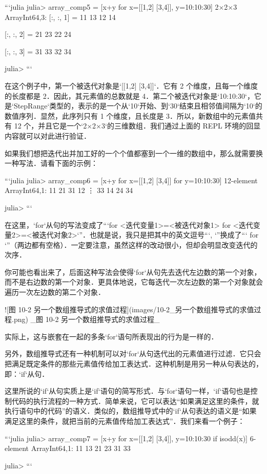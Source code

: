 ```julia
julia> array_comp5 = [x+y for x=[[1,2] [3,4]], y=10:10:30]
2×2×3 Array{Int64,3}:
[:, :, 1] =
 11  13
 12  14

[:, :, 2] =
 21  23
 22  24

[:, :, 3] =
 31  33
 32  34

julia> 
```

在这个例子中，第一个被迭代对象是`[[1,2] [3,4]]`．它有 2 个维度，且每一个维度的长度都是 2．因此，其元素值的总数就是 4．第二个被迭代对象是`10:10:30`，它是`StepRange`类型的，表示的是一个从`10`开始、到`30`结束且相邻值间隔为`10`的数值序列．显然，此序列只有 1 个维度，且长度是 3．所以，新数组中的元素值共有 12 个，并且它是一个`2×2×3`的三维数组．我们通过上面的 REPL 环境的回显内容就可以对此进行验证．

如果我们想把迭代出并加工好的一个个值都塞到一个一维的数组中，那么就需要换一种写法．请看下面的示例：

```julia
julia> array_comp6 = [x+y for x=[[1,2] [3,4]] for y=10:10:30]
12-element Array{Int64,1}:
 11
 21
 31
 12
  ⋮
 33
 14
 24
 34

julia> 
```

在这里，`for`从句的写法变成了“`for <迭代变量1>=<被迭代对象1> for <迭代变量2>=<被迭代对象2>`”．也就是说，我只是把其中的英文逗号“`, `”换成了“` for `”（两边都有空格）．一定要注意，虽然这样的改动很小，但却会明显改变迭代的次序．

你可能也看出来了，后面这种写法会使得`for`从句先去迭代左边数的第一个对象，而不是右边数的第一个对象．更具体地说，它每迭代一次左边数的第一个对象就会遍历一次左边数的第二个对象．

![图 10-2 另一个数组推导式的求值过程](images/10-2_另一个数组推导式的求值过程.png)
_图 10-2 另一个数组推导式的求值过程_

实际上，这与嵌套在一起的多条`for`语句所表现出的行为是一样的．

另外，数组推导式还有一种机制可以对`for`从句迭代出的元素值进行过滤．它只会把满足既定条件的那些元素值传给加工表达式．这种机制是用另一种从句表达的，即：`if`从句．

这里所说的`if`从句实质上是`if`语句的简写形式．与`for`语句一样，`if`语句也是控制代码的执行流程的一种方式．简单来说，它可以表达“如果满足这里的条件，就执行语句中的代码”的语义．类似的，数组推导式中的`if`从句表达的语义是“如果满足这里的条件，就把当前的元素值传给加工表达式”．我们来看一个例子：

```julia
julia> array_comp7 = [x+y for x=[[1,2] [3,4]], y=10:10:30 if isodd(x)]
6-element Array{Int64,1}:
 11
 13
 21
 23
 31
 33

julia>
```

